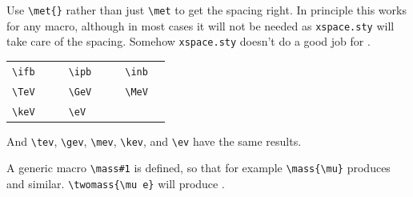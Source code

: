 \documentclass[11pt,a4paper]{atlasnote}
\begin{document}
\noindent Use \verb+\met{}+ rather than just \verb+\met+ to get the spacing
right. In principle this works for any macro, although in most cases it will
not be needed as {\tt xspace.sty} will take care of the spacing. Somehow
{\tt xspace.sty} doesn't do a good job for \met.

\vspace{5mm}

\begin{tabular}{llcllcll}
\verb+\ifb+ & \ifb{} & \hspace{1cm} &
\verb+\ipb+ & \ipb{} & \hspace{1cm} &
\verb+\inb+ & \inb{} \\
\verb+\TeV+ & \TeV{} & &
\verb+\GeV+ & \GeV{} & &
\verb+\MeV+ & \MeV{} \\
\verb+\keV+ & \keV{} & &
\verb+\eV+ & \eV{} & & & \\
\end{tabular}

\medskip

\noindent And \verb+\tev+, \verb+\gev+, \verb+\mev+, \verb+\kev+, and
\verb+\ev+ have the same results.

\medskip

\noindent A generic macro \verb+\mass#1+ is defined, so that for example
\verb+\mass{\mu}+ produces \mass{\mu} and similar.
\verb+\twomass{\mu e}+ will produce .
\end{document}

